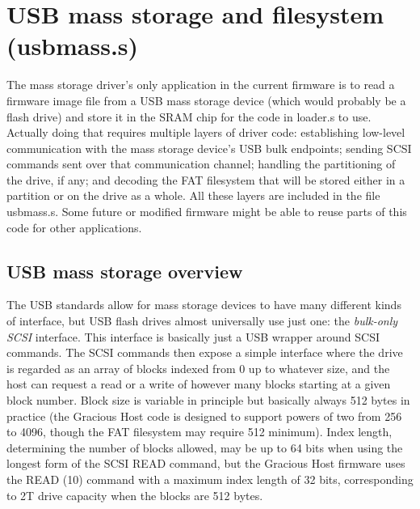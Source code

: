
%
%
%
%
%
%

\chapter{USB mass storage and filesystem (usbmass.s)}

The mass storage driver's only application in the current firmware is to
read a firmware image file from a USB mass storage device (which would
probably be a flash drive) and store it in the SRAM chip for the code in
loader.s to use.  Actually doing that requires multiple layers of driver
code: establishing low-level communication with the mass storage device's
USB bulk endpoints; sending SCSI commands sent over that communication
channel; handling the partitioning of the drive, if any; and decoding the
FAT filesystem that will be stored either in a partition or on the drive as
a whole.  All these layers are included in the file usbmass.s.  Some future
or modified firmware might be able to reuse parts of this code for other
applications.

\section{USB mass storage overview}

The USB standards allow for mass storage devices to have many different
kinds of interface, but USB flash drives almost universally use just one:
the \emph{bulk-only SCSI} interface.  This interface is basically just a USB
wrapper around SCSI commands.  The SCSI commands then expose a simple
interface where the drive is regarded as an array of blocks indexed from 0
up to whatever size, and the host can request a read or a write of however
many blocks starting at a given block number.  Block size is variable in
principle but basically always 512 bytes in practice (the Gracious Host code
is designed to support powers of two from 256 to 4096, though the FAT
filesystem may require 512 minimum).  Index length, determining the number
of blocks allowed, may be up to 64 bits when using the longest form of the
SCSI READ command, but the Gracious Host firmware uses the READ (10) command
with a maximum index length of 32 bits, corresponding to 2T drive capacity
when the blocks are 512 bytes.


